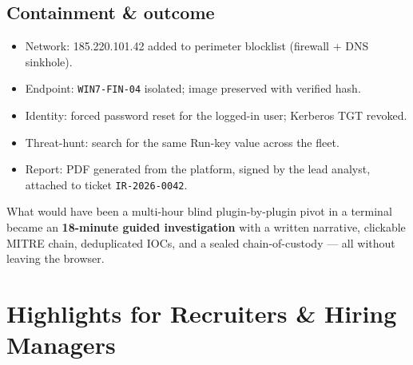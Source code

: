\documentclass[11pt,a4paper]{article}
\begin{document}
\subsection{Containment \& outcome}
\begin{itemize}[leftmargin=1.2em,itemsep=2pt]
  \item Network: 185.220.101.42 added to perimeter blocklist (firewall + DNS sinkhole).
  \item Endpoint: \texttt{WIN7-FIN-04} isolated; image preserved with verified hash.
  \item Identity: forced password reset for the logged-in user; Kerberos TGT revoked.
  \item Threat-hunt: search for the same Run-key value across the fleet.
  \item Report: PDF generated from the platform, signed by the lead analyst,
        attached to ticket \texttt{IR-2026-0042}.
\end{itemize}

\begin{infobox}[Outcome]
What would have been a multi-hour blind plugin-by-plugin pivot in a terminal
became an \textbf{18-minute guided investigation} with a written narrative,
clickable MITRE chain, deduplicated IOCs, and a sealed chain-of-custody — all
without leaving the browser.
\end{infobox}

\section{Highlights for Recruiters \& Hiring Managers}
\end{document}
